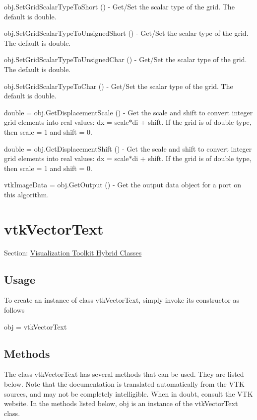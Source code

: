 \begin{DoxyItemize}
\item {\ttfamily obj.\-Set\-Grid\-Scalar\-Type\-To\-Short ()} -\/ Get/\-Set the scalar type of the grid. The default is double.  
\item {\ttfamily obj.\-Set\-Grid\-Scalar\-Type\-To\-Unsigned\-Short ()} -\/ Get/\-Set the scalar type of the grid. The default is double.  
\item {\ttfamily obj.\-Set\-Grid\-Scalar\-Type\-To\-Unsigned\-Char ()} -\/ Get/\-Set the scalar type of the grid. The default is double.  
\item {\ttfamily obj.\-Set\-Grid\-Scalar\-Type\-To\-Char ()} -\/ Get/\-Set the scalar type of the grid. The default is double.  
\item {\ttfamily double = obj.\-Get\-Displacement\-Scale ()} -\/ Get the scale and shift to convert integer grid elements into real values\-: dx = scale$\ast$di + shift. If the grid is of double type, then scale = 1 and shift = 0.  
\item {\ttfamily double = obj.\-Get\-Displacement\-Shift ()} -\/ Get the scale and shift to convert integer grid elements into real values\-: dx = scale$\ast$di + shift. If the grid is of double type, then scale = 1 and shift = 0.  
\item {\ttfamily vtk\-Image\-Data = obj.\-Get\-Output ()} -\/ Get the output data object for a port on this algorithm.  
\end{DoxyItemize}\hypertarget{vtkhybrid_vtkvectortext}{}\section{vtk\-Vector\-Text}\label{vtkhybrid_vtkvectortext}
Section\-: \hyperlink{sec_vtkhybrid}{Visualization Toolkit Hybrid Classes} \hypertarget{vtkwidgets_vtkxyplotwidget_Usage}{}\subsection{Usage}\label{vtkwidgets_vtkxyplotwidget_Usage}
To create an instance of class vtk\-Vector\-Text, simply invoke its constructor as follows \begin{DoxyVerb}  obj = vtkVectorText
\end{DoxyVerb}
 \hypertarget{vtkwidgets_vtkxyplotwidget_Methods}{}\subsection{Methods}\label{vtkwidgets_vtkxyplotwidget_Methods}
The class vtk\-Vector\-Text has several methods that can be used. They are listed below. Note that the documentation is translated automatically from the V\-T\-K sources, and may not be completely intelligible. When in doubt, consult the V\-T\-K website. In the methods listed below, {\ttfamily obj} is an instance of the vtk\-Vector\-Text class. 
